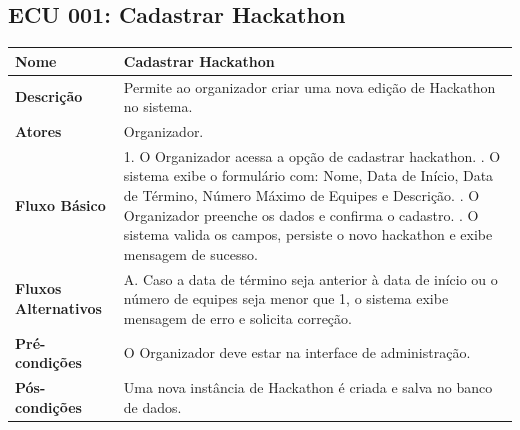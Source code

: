 \documentclass[12pt]{article}
\begin{document}
\subsection{ECU 001: Cadastrar Hackathon}
\begin{table}[H]
\centering
\small
\begin{tabular}{|p{3.2cm}|p{11.5cm}|}
\hline
\textbf{Nome} & Cadastrar Hackathon \\ \hline
\textbf{Descrição} & Permite ao organizador criar uma nova edição de Hackathon no sistema. \\ \hline
\textbf{Atores} & Organizador. \\ \hline
\textbf{Fluxo Básico} & 
1. O Organizador acessa a opção de cadastrar hackathon. \newline
2. O sistema exibe o formulário com: Nome, Data de Início, Data de Término, Número Máximo de Equipes e Descrição. \newline
3. O Organizador preenche os dados e confirma o cadastro. \newline
4. O sistema valida os campos, persiste o novo hackathon e exibe mensagem de sucesso. \\ \hline
\textbf{Fluxos Alternativos} & 
A. Caso a data de término seja anterior à data de início ou o número de equipes seja menor que 1, o sistema exibe mensagem de erro e solicita correção. \\ \hline
\textbf{Pré-condições} & O Organizador deve estar na interface de administração. \\ \hline
\textbf{Pós-condições} & Uma nova instância de Hackathon é criada e salva no banco de dados. \\ \hline
\end{tabular}
\end{table}
\end{document}
